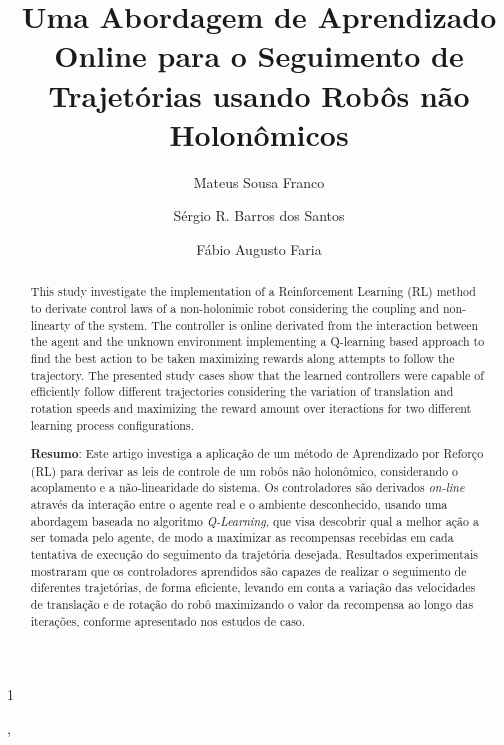 \documentclass[a4paper]{ifacconf}
\def\portugues{1}
\def\portugues{0}
\begin{document}
	
	
\if\portugues1

% 
	
\begin{frontmatter}

\title{Uma Abordagem de Aprendizado Online para o Seguimento de Trajetórias usando Robôs não Holonômicos} 



\author[First]{Mateus Sousa Franco}, 
\author[First]{Sérgio R. Barros dos Santos}
\author[First]{Fábio Augusto Faria}

\address[First]{Instituto de Ciência e Tecnologia, Universidade Federal de São Paulo, SP, (e-mail: mateus.franco@unifesp.br e sergio.ronaldo@unifesp.br).}


\renewcommand{\abstractname}{{\bf Abstract:~}}
\begin{abstract}                %
This study investigate the implementation of a Reinforcement Learning (RL) method to derivate control laws of a non-holonimic robot considering the coupling and non-linearty of the system. The controller is online derivated from the interaction between the agent and the unknown environment implementing a Q-learning based approach to find the best action to be taken maximizing rewards along attempts to follow the trajectory. The presented study cases show that the learned controllers were capable of efficiently follow different trajectories considering the variation of translation and rotation speeds and maximizing the reward amount over iteractions for two different learning process configurations.  


\vskip 1mm%
{\noindent \bf Resumo}:  
Este artigo investiga a aplicação de um método de Aprendizado por Reforço (RL) para derivar as leis de controle de um robôs não holonômico, considerando o acoplamento e a não-linearidade do sistema. Os controladores são derivados \emph{on-line} através da interação entre o agente real e o ambiente desconhecido, usando uma abordagem baseada no algoritmo \emph{Q-Learning}, que visa descobrir qual a melhor ação a ser tomada pelo agente, de modo a maximizar as recompensas recebidas em cada tentativa de execução do seguimento da trajetória desejada. Resultados experimentais mostraram que os controladores aprendidos são capazes de realizar o seguimento de diferentes trajetórias, de forma eficiente, levando em conta a variação das velocidades de translação e de rotação do robô maximizando o valor da recompensa ao longo das iterações, conforme apresentado nos estudos de caso.



\end{abstract}
\end{frontmatter}
\end{document}
